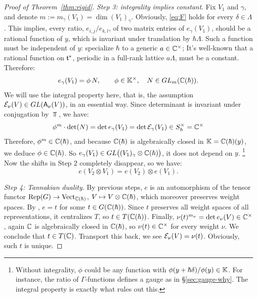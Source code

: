 \documentclass{article}
\theoremstyle{plain}
\theoremstyle{definition}
\theoremstyle{remark}
\numberwithin{equation}{section}
\begin{document}
\begin{proof}[Proof of Theorem~\ref{thm:rigid}]
\emph{Step 3: integrality implies constant}. Fix $V_1$ and $\gamma$, and denote $m:=m_\gamma(V_1) = \dim (V_1)_\gamma$. Obviously, \eqref{eq:F} holds for every $\delta\in\Lambda$. This implies, every ratio, $e_{i,j}/e_{k,l}$, of two matrix entries of $e_\gamma(V_1)$, should be a rational function of $y$, which is invariant under translation by $\hbar\Lambda$. Such a function must be independent of $y$: specialize $\hbar$ to a generic $a\in\mathbb{C}^\times$; It's well-known that a rational function on $\mathfrak{t}^*$, periodic in a full-rank lattice $a\Lambda$, must be a constant. Therefore:
\[
e_\gamma(V_1)=\phi\,N,\qquad \phi\in\mathbb K^\times,\quad N\in GL_m(\mathbb{C}(\hbar)).
\]
We will use the integral property here, that is, the assumption $\mathcal E_\nu (V)\in GL(\mathsf A_\nu (V))$, in an essential way. Since determinant is invariant under conjugation by $\Top$, we have:
\[ \phi^m \cdot \det(N) = \det e_\gamma(V_1)=\det\mathcal E_\gamma(V_1)\in S_\hbar^\times=\mathbb{C}^\times
\]
Therefore, $\phi^m\in\mathbb{C}(\hbar)$, and because $\mathbb{C}(\hbar)$ is algebraically closed in $\mathbb K=\mathbb{C}(\hbar)(y)$, we deduce $\phi\in\mathbb{C}(\hbar)$. So $e_\gamma(V_1)\in GL\bigl((V_1)_\gamma\otimes\mathbb{C}(\hbar)\bigr)$, it does not depend on $y$. \footnote{Without integrality, $\phi$ could be any function with $\phi(y+\hbar\delta)/\phi(y)\in\mathbb K$. For instance, the ratio of $\Gamma$-functions defines a gauge as in \S\ref{sec:gauge-why}. The integral property is exactly what rules out this.} Now the shifts in Step 2 completely disappear, so we have:
\[
e(V_2\otimes V_1)=e(V_2)\otimes e(V_1).
\]

\emph{Step 4: Tannakian duality.} By previous steps, $e$ is an automorphism of the tensor functor $\operatorname{Rep}(G)\to\operatorname{Vect}_{\mathbb{C}(\hbar)}$, $V\mapsto V\otimes\mathbb{C}(\hbar)$, which moreover preserves weight spaces. By \cite[Proposition 2.8]{DeligneMilne}, $e=t$ for some $t\in G(\mathbb{C}(\hbar))$. Since $t$ preserves all weight spaces of all representations, it centralizes $T$, so $t\in T(\mathbb{C}(\hbar))$. Finally, $\nu(t)^{m_\nu}=\det e_\nu(V)\in\mathbb{C}^\times$, again $\mathbb{C}$ is algebraically closed in $\mathbb{C}(\hbar)$, so $\nu(t)\in\mathbb{C}^\times$ for every weight $\nu$. We conclude that $t\in T(\mathbb{C})$. Transport this back, we see $\mathcal E_\nu(V)=\nu(t)$. Obviously, such $t$ is unique.
\end{proof}
\end{document}
